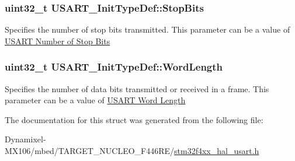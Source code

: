 \subsubsection[{\texorpdfstring{Stop\+Bits}{StopBits}}]{\setlength{\rightskip}{0pt plus 5cm}uint32\+\_\+t U\+S\+A\+R\+T\+\_\+\+Init\+Type\+Def\+::\+Stop\+Bits}\hypertarget{struct_u_s_a_r_t___init_type_def_a1d8f4c07fa88a7e4b50c403b391e5fe5}{}\label{struct_u_s_a_r_t___init_type_def_a1d8f4c07fa88a7e4b50c403b391e5fe5}
Specifies the number of stop bits transmitted. This parameter can be a value of \hyperlink{group___u_s_a_r_t___stop___bits}{U\+S\+A\+RT Number of Stop Bits} 
\subsubsection[{\texorpdfstring{Word\+Length}{WordLength}}]{\setlength{\rightskip}{0pt plus 5cm}uint32\+\_\+t U\+S\+A\+R\+T\+\_\+\+Init\+Type\+Def\+::\+Word\+Length}\hypertarget{struct_u_s_a_r_t___init_type_def_ac4012d27b28014f60a3ad987c62d4fc7}{}\label{struct_u_s_a_r_t___init_type_def_ac4012d27b28014f60a3ad987c62d4fc7}
Specifies the number of data bits transmitted or received in a frame. This parameter can be a value of \hyperlink{group___u_s_a_r_t___word___length}{U\+S\+A\+RT Word Length} 

The documentation for this struct was generated from the following file\+:\begin{DoxyCompactItemize}
\item 
Dynamixel-\/\+M\+X106/mbed/\+T\+A\+R\+G\+E\+T\+\_\+\+N\+U\+C\+L\+E\+O\+\_\+\+F446\+R\+E/\hyperlink{stm32f4xx__hal__usart_8h}{stm32f4xx\+\_\+hal\+\_\+usart.\+h}\end{DoxyCompactItemize}
